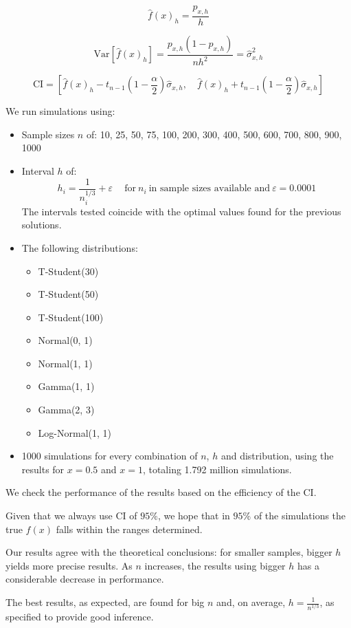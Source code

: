 \documentclass{article}
\begin{document}
$$
\hat{f}(x)_h = \frac{p_{x, h}}{h} 
$$

$$
\text{Var}[\hat{f}(x)_h] = \frac{p_{x, h} (1 - p_{x, h})}{n h^2} = \hat{\sigma}^2_{x, h}
$$

$$
\text{CI} = \left[
  \hat{f}(x)_h - t_{n-1}\left(1 - \frac{\alpha}{2}\right) \hat{\sigma}_{x, h},
  \quad \hat{f}(x)_h + t_{n-1}\left(1 - \frac{\alpha}{2}\right) \hat{\sigma}_{x, h}
\right]
$$

We run simulations using:
\begin{itemize}
  \item Sample sizes $n$ of: 10, 25, 50, 75, 100, 200, 300, 400, 500, 600, 700, 800, 900, 1000
  \item Interval $h$ of:
  $$
  h_i = \frac{1}{n_i^{1/3}} + \varepsilon \quad \ \text{for} \ n_i \ \text{in sample sizes available and} \ \varepsilon = 0.0001 
  $$
  The intervals tested coincide with the optimal values found for the previous solutions.
  \item The following distributions:
  \begin{itemize}
    \item T-Student(30)
    \item T-Student(50)
    \item T-Student(100)
    \item Normal(0, 1)
    \item Normal(1, 1)
    \item Gamma(1, 1)
    \item Gamma(2, 3)
    \item Log-Normal(1, 1)
  \end{itemize}
  \item 1000 simulations for every combination of $n$, $h$ and distribution, using the results for $x = 0.5$ and $x = 1$, totaling 1.792 million simulations.
\end{itemize}

We check the performance of the results based on the efficiency of the CI.

Given that we always use CI of $95\%$, we hope that in $95\%$ of the simulations the true $f(x)$ falls within the ranges determined.

Our results agree with the theoretical conclusions: for smaller samples, bigger $h$ yields more precise results. As $n$ increases, the results using bigger $h$ has a considerable decrease in performance.

The best results, as expected, are found for big $n$ and, on average, $h = \frac{1}{n^{1/3}}$, as specified to provide good inference.
\end{document}
